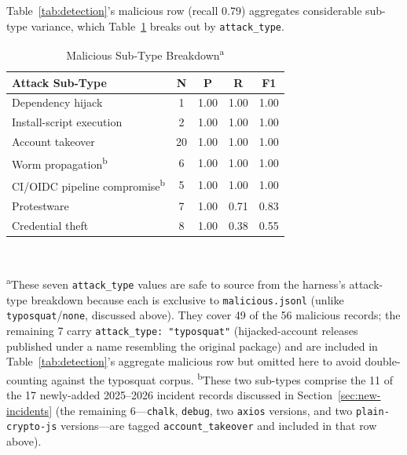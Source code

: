 \documentclass[journal]{IEEEtran}
\begin{document}
Table~\ref{tab:detection}'s malicious row (recall 0.79) aggregates considerable sub-type variance, which
Table~\ref{tab:malicious-subtypes} breaks out by \texttt{attack\_type}.

\begin{table}[t]
\caption{Malicious Sub-Type Breakdown\textsuperscript{a}}
\label{tab:malicious-subtypes}
\centering
\begin{tabular}{@{}lcccc@{}}
\toprule
\textbf{Attack Sub-Type} & \textbf{N} & \textbf{P} & \textbf{R} & \textbf{F1} \\
\midrule
Dependency hijack       & 1  & 1.00 & 1.00 & 1.00 \\
Install-script execution & 2  & 1.00 & 1.00 & 1.00 \\
Account takeover        & 20 & 1.00 & 1.00 & 1.00 \\
Worm propagation\textsuperscript{b} & 6 & 1.00 & 1.00 & 1.00 \\
CI/OIDC pipeline compromise\textsuperscript{b} & 5 & 1.00 & 1.00 & 1.00 \\
Protestware             & 7  & 1.00 & 0.71 & 0.83 \\
Credential theft        & 8  & 1.00 & 0.38 & 0.55 \\
\bottomrule
\end{tabular}
\\[2pt]
\raggedright\footnotesize\textsuperscript{a}These seven \texttt{attack\_type} values are safe to source from
the harness's attack-type breakdown because each is exclusive to \texttt{malicious.jsonl} (unlike
\texttt{typosquat}/\texttt{none}, discussed above). They cover 49 of the 56 malicious records; the remaining
7 carry \texttt{attack\_type: "typosquat"} (hijacked-account releases published under a name resembling the
original package) and are included in Table~\ref{tab:detection}'s aggregate malicious row but omitted here to
avoid double-counting against the typosquat corpus.
\textsuperscript{b}These two sub-types comprise the 11 of the 17 newly-added 2025--2026 incident records
discussed in Section~\ref{sec:new-incidents} (the remaining 6---\texttt{chalk}, \texttt{debug}, two
\texttt{axios} versions, and two \texttt{plain-crypto-js} versions---are tagged \texttt{account\_takeover}
and included in that row above).
\end{table}
\end{document}
